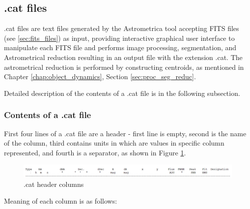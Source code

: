 \subsection{.cat files}\label{sec:cat_files}
	
	.cat files are text files generated by the Astrometrica tool accepting FITS files (see \ref{sec:fits_files}) as input, providing interactive graphical user interface to manipulate each FITS file and performs image processing, segmentation, and Astrometrical reduction resulting in an output file with the extension .cat. The astrometrical reduction is performed by constructing centroids, as mentioned in Chapter \ref{chap:object_dynamics}, Section \ref{sec:proc_seg_reduc}.
	
	 Detailed description of the contents of a .cat file is in the following subsection.
	
\subsubsection{Contents of a .cat file}\label{subsubsec:content_cat}
	
	First four lines of a .cat file are a header - first line is empty, second is the name of the column, third contains units in which are values in specific column represented, and fourth is a separator, as shown in Figure \ref{fig:cat_header}.
	
	\begin{figure}[H]
	  \includegraphics[width=\linewidth]{images/cat_columns}
		  \caption{.cat header columns}
	  \label{fig:cat_header}
	\end{figure}
	
	Meaning of each column is as follows:
	
